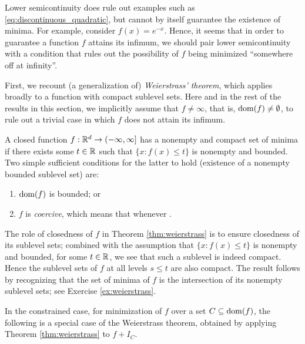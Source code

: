Lower semicontinuity does rule out examples such as
\eqref{eq:discontinuous_quadratic}, but cannot by itself guarantee the existence
of minima. For example, consider $f(x) = e^{-x}$. Hence, it seems that in order
to guarantee a function $f$ attains its infimum, we should pair lower
semicontinuity with a condition that rules out the possibility of $f$ being
minimized ``somewhere off at infinity''.

First, we recount (a generalization of) \emph{Weierstrass' theorem}, which
applies broadly to a function with compact sublevel sets. Here and in the rest
of the results in this section, we implicitly assume that $f \not= \infty$, that
is, $\operatorname{dom}(f) \not= \emptyset$, to rule out a trivial case in which $f$ does not 
attain its infimum.   

\begin{Theorem}
\label{thm:weierstrass}
A closed function $f : \mathbb{R}^d \to (-\infty, \infty]$ has a nonempty and compact
set of minima if there exists some $t \in \mathbb{R}$ such that $\{ x : f(x) \leq t\}$
is nonempty and bounded. Two simple sufficient conditions for the latter to
hold (existence of a nonempty bounded sublevel set) are:
\begin{enumerate}[label=(\roman*)]
\item $\operatorname{dom}(f)$ is bounded; or
\item $f$ is \emph{coercive}, which means that  whenever .  
\end{enumerate}
\end{Theorem}


The role of closedness of $f$ in Theorem \ref{thm:weierstrass} is to ensure
closedness of its sublevel sets; combined with the assumption that $\{x : f(x)
\leq t\}$ is nonempty and bounded, for some $t \in \mathbb{R}$, we see that such a
sublevel is indeed compact. Hence the sublevel sets of $f$ at all levels $s \leq 
t$ are also compact. The result follows by recognizing that the set of minima
of $f$ is the intersection of its nonempty sublevel sets; see Exercise
\ref{ex:weierstrass}.

In the constrained case, for minimization of $f$ over a set $C \subseteq
\operatorname{dom}(f)$, the following is a special case of the Weierstrass theorem, obtained
by applying Theorem \ref{thm:weierstrass} to $f + I_C$.

